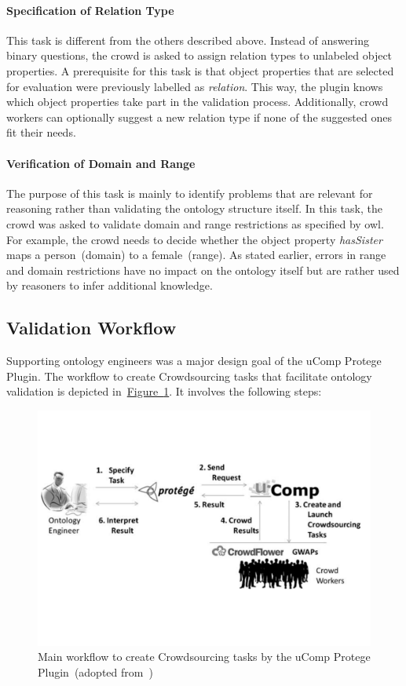 \paragraph{Specification of Relation Type}
This task is different from the others described above. Instead of answering binary questions, the crowd is asked to assign relation types to unlabeled object properties. A prerequisite for this task is that object properties that are selected for evaluation were previously labelled as \emph{relation}. This way, the plugin knows which object properties take part in the validation process. Additionally, crowd workers can optionally suggest a new relation type if none of the suggested ones fit their needs. 

\paragraph{Verification of Domain and Range}
The purpose of this task is mainly to identify problems that are relevant for reasoning rather than validating the ontology structure itself. In this task, the crowd was asked to validate domain and range restrictions as specified by \gls{owl}. For example, the crowd needs to decide whether the object property \emph{hasSister} maps a person~(domain) to a female~(range). As stated earlier, errors in range and domain restrictions have no impact on the ontology itself but are rather used by reasoners to infer additional knowledge. 

\subsection{Validation Workflow}
Supporting ontology engineers was a major design goal of the uComp Protege Plugin.
The workflow to create Crowdsourcing tasks that facilitate ontology validation is depicted in~\hyperref[fig:ucomp_protege_plugin_workflow]{Figure~\ref*{fig:ucomp_protege_plugin_workflow}}.
It involves the following steps:
\begin{figure}
	 \centering
	 \includegraphics[width=\textwidth]{graphics/ucomp_protege_workflow}
	 \caption{Main workflow to create Crowdsourcing tasks by the uComp Protege Plugin~(adopted from~\cite{wohlgenannt2016})}
	 \label{fig:ucomp_protege_plugin_workflow}
\end{figure}

